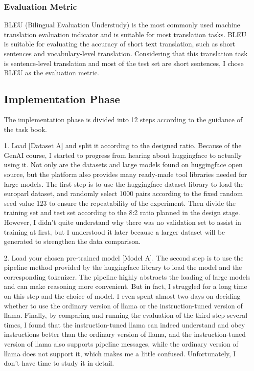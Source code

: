\subsubsection{Evaluation Metric}
BLEU (Bilingual Evaluation Understudy)\cite{10.3115/1073083.1073135} is the most commonly used 
machine translation evaluation indicator and is suitable for most translation tasks. 
BLEU is suitable for evaluating the accuracy of short text translation, 
such as short sentences and vocabulary-level translation. 
Considering that this translation task is sentence-level translation and 
most of the test set are short sentences, I chose BLEU as the evaluation metric.

\subsection{Implementation Phase}
\label{subsec:implementation}
The implementation phase is divided into 12 steps according to the guidance of the task book.

1. Load [Dataset A] and split it according to the designed ratio.
Because of the GenAI course, I started to progress from hearing about huggingface to actually using it. 
Not only are the datasets and large models found on huggingface open source, 
but the platform also provides many ready-made tool libraries needed for large models.
The first step is to use the huggingface dataset library to load the europarl dataset, 
and randomly select 1000 pairs according to the fixed random seed value 123 to ensure the repeatability of the experiment. 
Then divide the training set and test set according to the 8:2 ratio planned in the design stage. 
However, I didn't quite understand why there was no validation set to assist in training at first, 
but I understood it later because a larger dataset will be generated to strengthen the data comparison.

2. Load your chosen pre-trained model [Model A].
The second step is to use the pipeline method provided by the huggingface library to load the model and the corresponding tokenizer. 
The pipeline highly abstracts the loading of large models and can make reasoning more convenient.
But in fact, I struggled for a long time on this step and the choice of model. 
I even spent almost two days on deciding whether to use the ordinary version of llama or the instruction-tuned version of llama. 
Finally, by comparing and running the evaluation of the third step several times, 
I found that the instruction-tuned llama can indeed understand and obey instructions better than the ordinary version of llama, 
and the instruction-tuned version of llama also supports pipeline messages, 
while the ordinary version of llama does not support it, which makes me a little confused.
Unfortunately, I don't have time to study it in detail.

